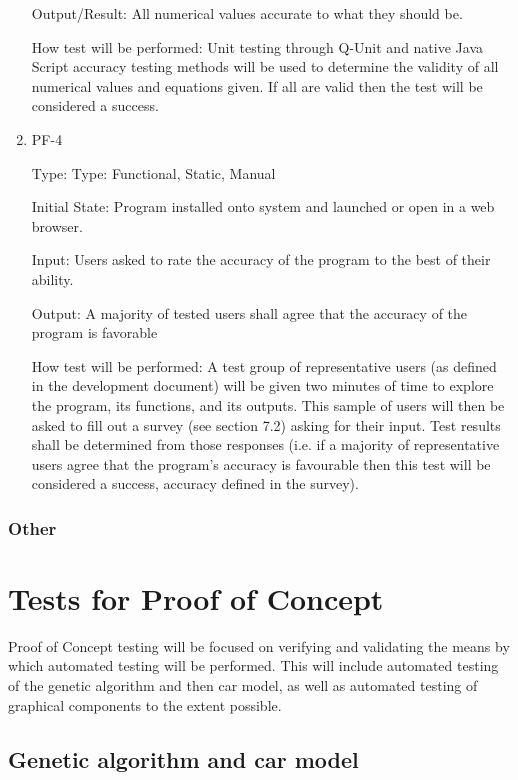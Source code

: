 \documentclass[12pt, titlepage]{article}
\begin{document}
\begin{enumerate}
Output/Result: All numerical values accurate to what they should be.
					
How test will be performed: Unit testing through Q-Unit and native Java Script accuracy testing methods will be used to determine the validity of all numerical values and equations given. If all are valid then the test will be considered a success.


\item{PF-4\\}

Type: Type: Functional, Static, Manual
					
Initial State: Program installed onto system and launched or open in a web browser.
					
Input: Users asked to rate the accuracy of the program to the best of their ability.
					
Output: A majority of tested users shall agree that the accuracy of the program is favorable
					
 How test will be performed: A test group of representative users (as defined in the development document) will be given two minutes of time to explore the program, its functions, and its outputs. This sample of users will then be asked to fill out a survey (see section 7.2) asking for their input. Test results shall be determined from those responses (i.e. if a majority of representative users agree that the program's accuracy is favourable then this test will be considered a success, accuracy defined in the survey).

\end{enumerate}

\subsubsection{Other}

\section{Tests for Proof of Concept}

Proof of Concept testing will be focused on verifying and validating the means by which automated testing will be performed. This will include automated testing of the genetic algorithm and then car model, as well as automated testing of graphical components to the extent possible.

\subsection{Genetic algorithm and car model}
\end{document}
